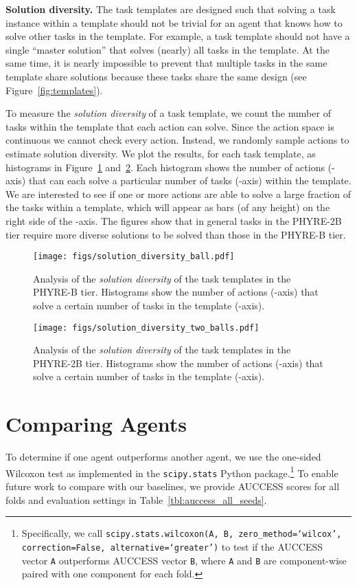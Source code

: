 \documentclass{article}
\begin{document}
\noindent\textbf{Solution diversity.} The task templates are designed such that solving a task instance within a template should not be trivial for an agent that knows how to solve other tasks in the template. For example, a task template should not have a single ``master solution'' that solves (nearly) all tasks in the template. At the same time, it is nearly impossible to prevent that multiple tasks in the same template share solutions because these tasks share the same design (see Figure~\ref{fig:templates}).

To measure the \emph{solution diversity} of a task template, we count the number of tasks within the template that each action can solve. Since the action space is continuous we cannot check every action. Instead, we randomly sample  actions to estimate solution diversity. We plot the results, for each task template, as histograms in Figure~\ref{fig:1B-diversity} and~\ref{fig:2B-diversity}. Each histogram shows the number of actions (-axis) that can each solve a particular number of tasks (-axis) within the template. We are interested to see if one or more actions are able to solve a large fraction of the tasks within a template, which will appear as bars (of any height) on the right side of the -axis. The figures show that in general tasks in the PHYRE-2B tier require more diverse solutions to be solved than those in the PHYRE-B tier.

\begin{figure}
\texttt{[image: figs/solution\_diversity\_ball.pdf]}
  \caption{
   Analysis of the \emph{solution diversity} of the task templates in the PHYRE-B tier. Histograms show the number of actions (-axis) that solve a certain number of tasks in the template (-axis).
    }
  \label{fig:1B-diversity}
\end{figure}



\begin{figure}
\texttt{[image: figs/solution\_diversity\_two\_balls.pdf]}
 \caption{
   Analysis of the \emph{solution diversity} of the task templates in the PHYRE-2B tier. Histograms show the number of actions (-axis) that solve a certain number of tasks in the template (-axis).
  }
  \label{fig:2B-diversity}
\end{figure}



\FloatBarrier

\newpage
\section{Comparing Agents}
To determine if one agent outperforms another agent, we use the one-sided Wilcoxon test as implemented in the
\texttt{scipy.stats} Python package.\footnote{Specifically, we call \texttt{scipy.stats.wilcoxon(A, B, zero\_method=`wilcox', correction=False, alternative=`greater')} to test if the AUCCESS vector \texttt{A} outperforms AUCCESS vector \texttt{B}, where \texttt{A} and \texttt{B} are component-wise paired with one component for each fold.} To enable future work to compare with our baselines, we provide AUCCESS scores for all folds and evaluation settings in Table~\ref{tbl:auccess_all_seeds}.
\end{document}
